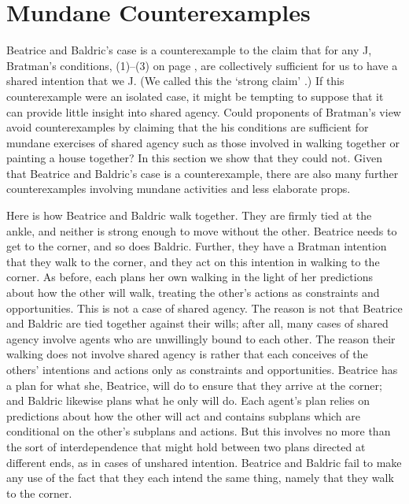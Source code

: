 \documentclass[12pt,\papersize]{extarticle}
\begin{document}
\section{Mundane Counterexamples}
Beatrice and Baldric's case is a counterexample to the claim that for any J, Bratman's conditions, (1)--(3) on page \pageref{quote:bratman_account}, are collectively sufficient for us to have a shared intention that we J.
(We called this the `strong claim'  .)
If this counterexample were an isolated case, it might be tempting to suppose that it can provide little insight into shared agency.
Could proponents of Bratman's view avoid counterexamples by claiming that the his conditions are sufficient for mundane exercises of shared agency such as those involved in walking together or painting a house together?
In this section we show that they could not.
Given that Beatrice and Baldric's case is a counterexample,
there are also many further counterexamples involving mundane activities and less elaborate props.

Here is how Beatrice and Baldric walk together.
They are firmly tied at the ankle, and neither is strong enough to move without the other.
Beatrice needs to get to the corner, and so does Baldric.
Further, they have a Bratman intention that they walk to the corner, and they act on this intention in walking to the corner.
As before, each plans her own walking in the light of her predictions about how the other will walk, treating the other's actions as constraints and opportunities.
This is not a case of shared agency.
The reason is not that Beatrice and Baldric are tied together against their wills; 
after all, many cases of shared agency involve agents who are unwillingly bound to each other.
The reason their walking does not involve shared agency 
is rather that each conceives of the others' intentions and actions only as constraints and opportunities.
Beatrice has a plan for what she, Beatrice, will do to ensure that they arrive at the corner; and Baldric likewise plans what he only will do.
Each agent's plan relies on predictions about how the other will act and contains subplans which are conditional on the other's subplans and actions.
But this involves no more than the sort of interdependence that might hold between two plans directed at different ends, as in cases of unshared intention.
Beatrice and Baldric fail to make any use of the fact that they each intend the same thing, namely that they walk to the corner.
\end{document}
